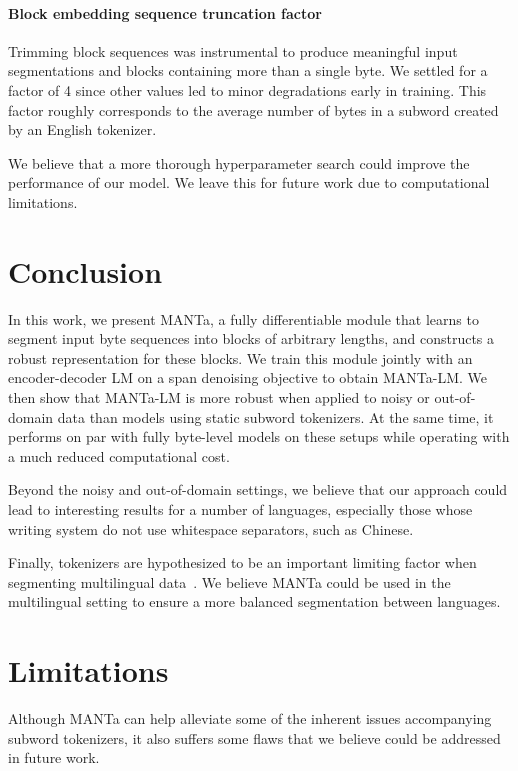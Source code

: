 \paragraph{Block embedding sequence truncation factor} Trimming block sequences was instrumental to produce meaningful input segmentations and blocks containing more than a single byte. We settled for a factor of 4 since other values led to minor degradations early in training. This factor roughly corresponds to the average number of bytes in a subword created by an English tokenizer.

We believe that a more thorough hyperparameter search could improve the performance of our model. We leave this for future work due to computational limitations.

\section*{Conclusion}
In this work, we present MANTa, a fully differentiable module that learns to segment input byte sequences into blocks of arbitrary lengths, and constructs a robust representation for these blocks. We train this module jointly with an encoder-decoder LM on a span denoising objective to obtain MANTa-LM. We then show that MANTa-LM is more robust when applied to noisy or out-of-domain data than models using static subword tokenizers. At the same time, it performs on par with fully byte-level models on these setups while operating with a much reduced computational cost.

Beyond the noisy and out-of-domain settings, we believe that our approach could lead to interesting results for a number of languages, especially those whose writing system do not use whitespace separators, such as Chinese.

Finally, tokenizers are hypothesized to be an important limiting factor when segmenting multilingual data~\cite{rust-etal-2021-good}. We believe MANTa could be used in the multilingual setting to ensure a more balanced segmentation between languages.


\section*{Limitations}
Although MANTa can help alleviate some of the inherent issues accompanying subword tokenizers, it also suffers some flaws that we believe could be addressed in future work.

